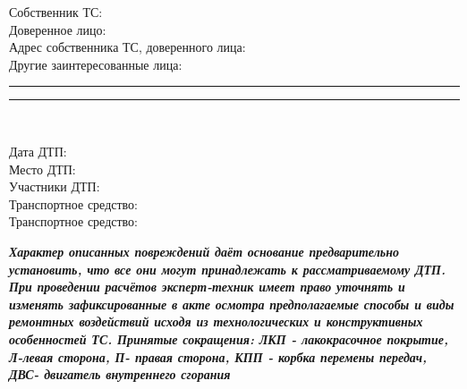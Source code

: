 \documentclass[a4paper,10pt]{report}
\begin{document}
\noindent Собственник ТС: \\
Доверенное лицо: \\
Адрес собственника ТС, доверенного лица: \\
Другие заинтересованные лица: \\


\begin{tcolorbox}[title=\textsl{Комплектация,  дополнительные и нестандартные опции},leftrule=0pt,rightrule=0pt,toprule=0pt,titlerule=0pt,sharp corners,
	colback=white,colframe=white,coltitle=black,colbacktitle=YellowOrange]
	\end{tcolorbox}
\vspace{-7mm}
\noindent\rule{170mm}{0.1mm}
\rule{170mm}{0.1mm}\\

\begin{tcolorbox}[title=\textsl{Сведения о ДТП},leftrule=0pt,rightrule=0pt,toprule=0pt,titlerule=0pt,sharp corners,
	colback=white,colframe=white,coltitle=black,colbacktitle=YellowOrange]
	
	Дата ДТП: \\
	Место ДТП: \\
	Участники ДТП:\\
	Транспортное средство: \\ 
	Транспортное средство: \\
\end{tcolorbox}
\vspace{-7mm}
\begin{tcolorbox}[title=\textsl{Результат осмотра},leftrule=0pt,rightrule=0pt,toprule=0pt,titlerule=0pt,sharp corners,
	colback=white,colframe=white,coltitle=black,colbacktitle=YellowOrange]
\end{tcolorbox}

\vspace{-12mm}

\vspace{-3mm}
\begin{spacing}{.65}
\begin{tcolorbox}[title=\textsl{Примечание},leftrule=-0.4pt,rightrule=-0.4pt,toprule=0pt,titlerule=0pt,sharp corners,
	colback=white,colframe=black,coltitle=black,colbacktitle=YellowOrange]
{\footnotesize \textbf{\textit{{Характер описанных повреждений даёт основание предварительно установить, что все они могут принадлежать
				к рассматриваемому ДТП. При проведении расчётов эксперт-техник имеет право уточнять и изменять зафиксированные в акте осмотра предполагаемые способы и
				виды ремонтных воздействий исходя из технологических и конструктивных особенностей ТС. Принятые сокращения: ЛКП - лакокрасочное
				покрытие, Л-левая сторона, П- правая сторона, КПП - корбка перемены передач, ДВС- двигатель внутреннего сгорания}}}}
\end{tcolorbox}
\end{spacing}
\vspace{2mm}
\end{document}
